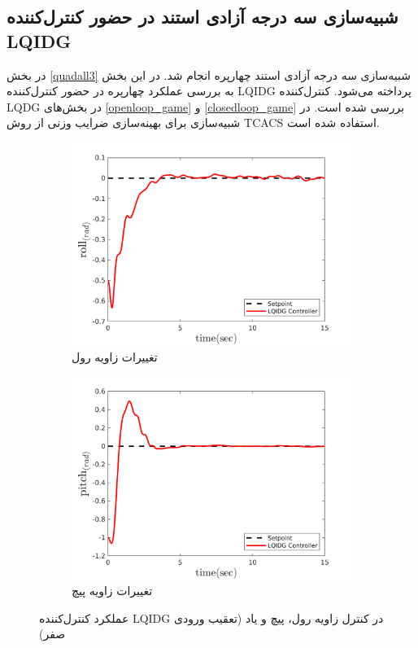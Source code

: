 \subsection{شبیه‌سازی سه درجه آزادی استند در حضور کنترل‌کننده LQIDG}\label{roll_pitch_yaw_lqidg_section}
در بخش
\ref{quadall3}
شبیه‌سازی سه درجه آزادی استند چهارپره انجام شد. در این بخش به بررسی عملکرد چهارپره در حضور کنترل‌کننده LQIDG پرداخته می‌شود. کنترل‌کننده LQDG در بخش‌های
\ref{openloop_game}
و
\ref{closedloop_game}
بررسی شده است.
 در شبیه‌سازی برای بهینه‌سازی ضرایب وزنی از روش
TCACS \cite{Karimi2010}
استفاده شده است.

\begin{figure}[H]
	\centering
	\begin{subfigure}[H]
		\centering
		\includegraphics[width=12cm]{../Figures/MIL/LQIDG/3DOF/lqidg_roll.png}
		\caption{تغییرات زاویه رول}
	\end{subfigure}%
	\begin{subfigure}
		\centering
		\includegraphics[width=12cm]{../Figures/MIL/LQIDG/3DOF/lqidg_pitch.png}
		\caption{تغییرات زاویه پیچ}
	\end{subfigure}
	\caption{‫‪عملکرد کنترل‌کننده LQIDG در کنترل زاویه رول، پیچ و یاد (تعقیب ورودی صفر)}
\end{figure}

